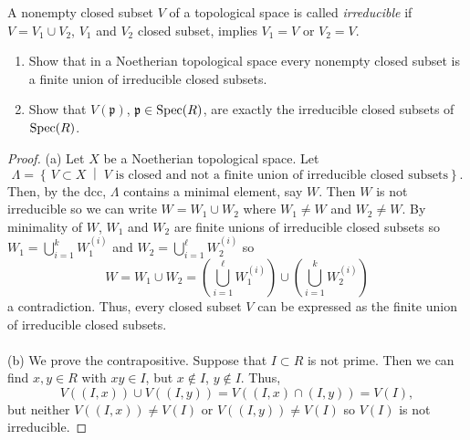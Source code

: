 \newpage
\begin{problem}
A nonempty closed subset $V$ of a topological space is called
\emph{irreducible} if $V=V_1\cup V_2$, $V_1$ and $V_2$ closed
subset, implies $V_1=V$ or $V_2=V$.
\begin{enumerate}[noitemsep,label=(\alph*)]
\item Show that in a Noetherian topological space every nonempty
  closed subset is a finite union of irreducible closed subsets.
\item Show that $V(\mathfrak{p})$, $\mathfrak{p}\in\operatorname{Spec}(R)$, are
  exactly the irreducible closed subsets of $\operatorname{Spec}(R)$.
\end{enumerate}
\end{problem}
\begin{proof}
(a) Let $X$ be a Noetherian topological space. Let
\[
\Lambda=\left\{ \,V\subset X\;\middle|\;\text{$V$ is closed and not a
    finite union of irreducible closed subsets} \right\}.
\]
Then, by the dcc, $\Lambda$ contains a minimal element, say $W$. Then
$W$ is not irreducible so we can write $W=W_1\cup W_2$ where $W_1\neq
W$ and $W_2\neq W$. By minimality of $W$, $W_1$ and $W_2$ are finite
unions of irreducible closed subsets so $W_1=\bigcup_{i=1}^k
W_1^{(i)}$ and $W_2=\bigcup_{i=1}^\ell W_2^{(i)}$ so
\[
W=W_1\cup W_2=\left( \bigcup_{i=1}^\ell W_1^{(i)} \right)\cup\left(
  \bigcup_{i=1}^k W_2^{(i)} \right)
\]
a contradiction. Thus, every closed subset $V$ can be expressed as the
finite union of irreducible closed subsets.
\\\\
(b) We prove the contrapositive. Suppose that $I\subset R$ is not
prime. Then we can find $x,y\in R$ with $xy\in I$, but $x\notin I$,
$y\notin I$. Thus,
\[
V((I,x))\cup V((I,y))=V((I,x)\cap (I,y))=V(I),
\]
but neither $V((I,x))\neq V(I)$ or $V((I,y))\neq V(I)$ so $V(I)$ is
not irreducible. \qedhere
\end{proof}
